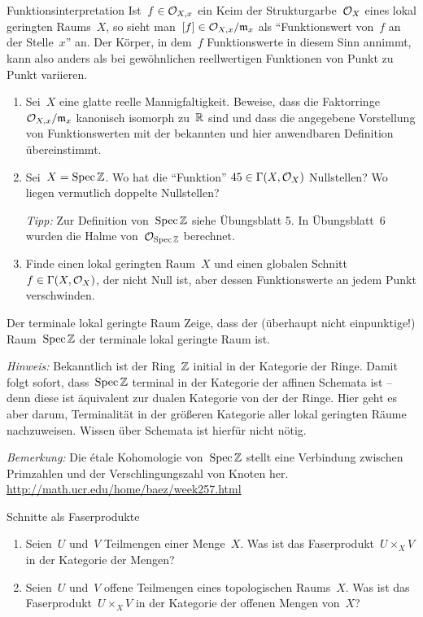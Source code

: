 \documentclass{uebblatt}
\begin{document}
\begin{aufgabe}{Funktionsinterpretation}
Ist~$f \in \mathcal{O}_{X,x}$ ein Keim der Strukturgarbe~$\mathcal{O}_X$ eines lokal geringten
Raums~$X$, so sieht man~$[f] \in \mathcal{O}_{X,x}/\mathfrak{m}_x$ als "`Funktionswert von~$f$ an
der Stelle~$x$"' an. Der Körper, in dem~$f$ Funktionswerte in diesem Sinn
annimmt, kann also anders als bei gewöhnlichen reellwertigen Funktionen von
Punkt zu Punkt variieren.
\begin{enumerate}
\item Sei~$X$ eine glatte reelle Mannigfaltigkeit. Beweise, dass die
Faktorringe~$\mathcal{O}_{X,x}/\mathfrak{m}_x$ kanonisch isomorph zu~$\mathbb{R}$ sind und dass die
angegebene Vorstellung von Funktionswerten mit der bekannten und hier
anwendbaren Definition übereinstimmt.
\item Sei~$X = \operatorname{Spec} \mathbb{Z}$. Wo hat die "`Funktion"' $45 \in \Gamma(X,\mathcal{O}_X)$
Nullstellen? Wo liegen vermutlich doppelte Nullstellen?

\emph{Tipp:} Zur Definition von~$\operatorname{Spec}\mathbb{Z}$ siehe Übungsblatt 5. In
Übungsblatt~6 wurden die Halme von~$\mathcal{O}_{\operatorname{Spec}\mathbb{Z}}$ berechnet.
\item Finde einen lokal geringten Raum~$X$ und einen globalen Schnitt~$f \in
\Gamma(X,\mathcal{O}_X)$, der nicht Null ist, aber dessen Funktionswerte an jedem Punkt
verschwinden.
\end{enumerate}
\end{aufgabe}

\begin{aufgabe}{Der terminale lokal geringte Raum}
Zeige, dass der (überhaupt nicht einpunktige!) Raum~$\operatorname{Spec} \mathbb{Z}$ der terminale
lokal geringte Raum ist.

\emph{Hinweis:} Bekanntlich ist der Ring~$\mathbb{Z}$ initial in der Kategorie der
Ringe. Damit folgt sofort, dass~$\operatorname{Spec}\mathbb{Z}$ terminal in der Kategorie der
affinen Schemata ist -- denn diese ist äquivalent zur dualen Kategorie von der
der Ringe. Hier geht es aber darum, Terminalität in der größeren Kategorie
aller lokal geringten Räume nachzuweisen. Wissen über Schemata ist hierfür
nicht nötig.

\emph{Bemerkung:} Die étale Kohomologie von~$\operatorname{Spec}\mathbb{Z}$ stellt eine Verbindung
zwischen Primzahlen und der Verschlingungszahl von Knoten her.
\url{http://math.ucr.edu/home/baez/week257.html}
\end{aufgabe}

\begin{aufgabe}{Schnitte als Faserprodukte}
\begin{enumerate}
\item Seien~$U$ und~$V$ Teilmengen einer Menge~$X$. Was ist das Faserprodukt~$U
\times_X V$ in der Kategorie der Mengen?
\item Seien~$U$ und~$V$ offene Teilmengen eines topologischen Raums~$X$. Was
ist das Faserprodukt~$U \times_X V$ in der Kategorie der offenen Mengen
von~$X$?
\end{enumerate}
\end{aufgabe}
\end{document}
